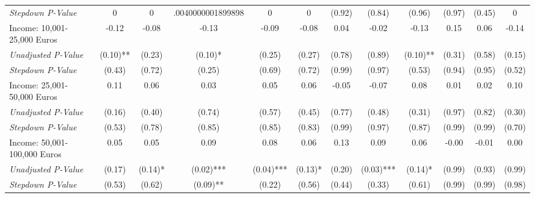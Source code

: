 \begin{tabular}{l c c c c c c c c c c c}
\quad \textit{Stepdown P-Value} & 0 & 0 & .0040000001899898 & 0 & 0 & (0.92) & (0.84) & (0.96) & (0.97) & (0.45) & 0 \\
Income: 10,001-25,000 Euros & -0.12 & -0.08 & -0.13 & -0.09 & -0.08 & 0.04 & -0.02 & -0.13 & 0.15 & 0.06 & -0.14 \\
\quad \textit{Unadjusted P-Value} & (0.10)** & (0.23) & (0.10)* & (0.25) & (0.27) & (0.78) & (0.89) & (0.10)** & (0.31) & (0.58) & (0.15) \\
\quad \textit{Stepdown P-Value} & (0.43) & (0.72) & (0.25) & (0.69) & (0.72) & (0.99) & (0.97) & (0.53) & (0.94) & (0.95) & (0.52) \\
Income: 25,001-50,000 Euros & 0.11 & 0.06 & 0.03 & 0.05 & 0.06 & -0.05 & -0.07 & 0.08 & 0.01 & 0.02 & 0.10 \\
\quad \textit{Unadjusted P-Value} & (0.16) & (0.40) & (0.74) & (0.57) & (0.45) & (0.77) & (0.48) & (0.31) & (0.97) & (0.82) & (0.30) \\
\quad \textit{Stepdown P-Value} & (0.53) & (0.78) & (0.85) & (0.85) & (0.83) & (0.99) & (0.97) & (0.87) & (0.99) & (0.99) & (0.70) \\
Income: 50,001-100,000 Euros & 0.05 & 0.05 & 0.09 & 0.08 & 0.06 & 0.13 & 0.09 & 0.06 & -0.00 & -0.01 & 0.00 \\
\quad \textit{Unadjusted P-Value} & (0.17) & (0.14)* & (0.02)*** & (0.04)*** & (0.13)* & (0.20) & (0.03)*** & (0.14)* & (0.99) & (0.93) & (0.99) \\
\quad \textit{Stepdown P-Value} & (0.53) & (0.62) & (0.09)** & (0.22) & (0.56) & (0.44) & (0.33) & (0.61) & (0.99) & (0.99) & (0.98) \\
\bottomrule
\end{tabular}

